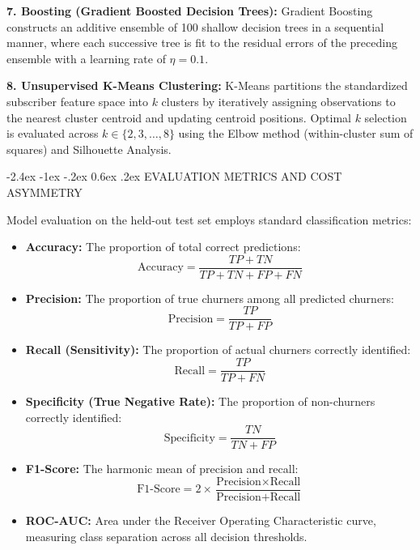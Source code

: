 \documentclass[12pt,oneside]{report}
\makeatletter
\renewcommand{\section}{\@startsection{section}{1}{\z@}%
  {-2.4ex \@plus -1ex \@minus -.2ex}%
  {0.6ex \@plus .2ex}%
  {\normalfont\large\bfseries}}
\makeatother
\begin{document}
\textbf{7. Boosting (Gradient Boosted Decision Trees):}
Gradient Boosting constructs an additive ensemble of 100 shallow decision trees in a sequential manner, where each successive tree is fit to the residual errors of the preceding ensemble with a learning rate of $\eta = 0.1$.

\textbf{8. Unsupervised K-Means Clustering:}
K-Means partitions the standardized subscriber feature space into $k$ clusters by iteratively assigning observations to the nearest cluster centroid and updating centroid positions. Optimal $k$ selection is evaluated across $k \in \{2, 3, \dots, 8\}$ using the Elbow method (within-cluster sum of squares) and Silhouette Analysis.
\newpage

\section{EVALUATION METRICS AND COST ASYMMETRY}

Model evaluation on the held-out test set employs standard classification metrics:
\begin{itemize}
    \item \textbf{Accuracy:} The proportion of total correct predictions:
    \begin{equation}
        \text{Accuracy} = \frac{TP + TN}{TP + TN + FP + FN}
    \end{equation}
    \item \textbf{Precision:} The proportion of true churners among all predicted churners:
    \begin{equation}
        \text{Precision} = \frac{TP}{TP + FP}
    \end{equation}
    \item \textbf{Recall (Sensitivity):} The proportion of actual churners correctly identified:
    \begin{equation}
        \text{Recall} = \frac{TP}{TP + FN}
    \end{equation}
    \item \textbf{Specificity (True Negative Rate):} The proportion of non-churners correctly identified:
    \begin{equation}
        \text{Specificity} = \frac{TN}{TN + FP}
    \end{equation}
    \item \textbf{F1-Score:} The harmonic mean of precision and recall:
    \begin{equation}
        \text{F1-Score} = 2 \times \frac{\text{Precision} \times \text{Recall}}{\text{Precision} + \text{Recall}}
    \end{equation}
    \item \textbf{ROC-AUC:} Area under the Receiver Operating Characteristic curve, measuring class separation across all decision thresholds.
\end{itemize}
\end{document}
